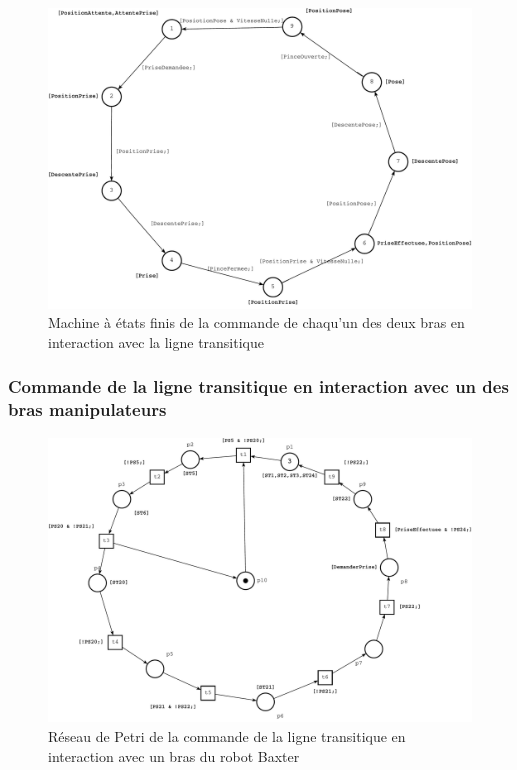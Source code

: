 \documentclass[a4paper,french, titlepage]{article}
\begin{document}
\begin{figure}[H] 
\begin{center}
\includegraphics[scale=0.5]{Images/main_commande_bras_GD.pdf} 
\end{center}
\caption{Machine à états finis de la commande de chaqu'un des deux bras en interaction avec la ligne transitique}
\label{main_commande_bras_GD}
\end{figure}

\subsubsection{Commande de la ligne transitique en interaction avec un des bras manipulateurs}

 

\begin{figure}[H] 
\begin{center}
\includegraphics[scale=0.5]{Images/main_commande_baxter_1_bras_ligne_transitique.pdf} 
\end{center}
\caption{Réseau de Petri de la commande de la ligne transitique en interaction avec un bras du robot Baxter}
\label{main_commande_baxter_1_bras_ligne_transitique}
\end{figure}
\end{document}
